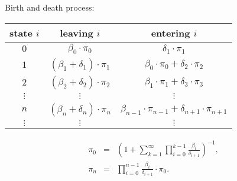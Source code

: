 \begin{example}
Birth and death process:

\begin{multicols}{2}
\begin{tabular}{|c|c|c|} \hline
  state $ i $ & leaving $ i $ & entering $ i $ \\ \hline
  $ 0 $ & $ \beta_{0} \cdot \pi_{0} $ & $ \delta_{1} \cdot \pi_{1} $ \\ \hline
  $ 1 $ & $ (\beta_{1} + \delta_{1}) \cdot \pi_{1} $ & $ \beta_{0} \cdot \pi_{0} + \delta_{2} \cdot \pi_{2} $ \\ \hline
  $ 2 $ & $ (\beta_{2} + \delta_{2}) \cdot \pi_{2} $ & $ \beta_{1} \cdot \pi_{1} + \delta_{3} \cdot \pi_{3} $ \\ \hline
  $ \vdots $ & $ \vdots $ & $ \vdots $ \\ \hline
  $ n $ & $ (\beta_{n} + \delta_{n}) \cdot \pi_{n} $ & $ \beta_{n - 1} \cdot \pi_{n - 1} + \delta_{n + 1} \cdot \pi_{n + 1} $ \\ \hline
  $ \vdots $ & $ \vdots $ & $ \vdots $ \\ \hline
\end{tabular}

\begin{eqnarray*}
\pi_{0} & = & \left( 1 + \sum_{k = 1}^{\infty} \prod_{i = 0}^{k - 1} \frac{\beta_{i}}{\delta_{i + 1}} \right)^{-1}, \\
\pi_{n} & = & \prod_{i = 0}^{n - 1} \frac{\beta_{i}}{\delta_{i + 1}} \cdot \pi_{0}.
\end{eqnarray*}
\end{multicols}
\end{example}
